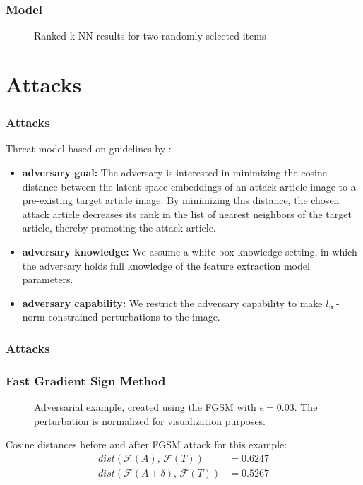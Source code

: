 \documentclass{beamer}
\begin{document}
	\begin{frame}
		\frametitle{Model}
		\begin{figure}[H]
			\centering
			\resizebox{\textwidth}{!}{}
			\caption{Ranked k-NN results for two randomly selected items}
			\label{fig:reco}
		\end{figure}
	\end{frame}
	\section{Attacks}
	\begin{frame}
		\frametitle{Attacks}
		Threat model based on guidelines by \cite{carlini2017towards}:
		\begin{itemize}
			\item \textbf{adversary goal:} The adversary is interested in minimizing the cosine distance between the latent-space embeddings of an attack article image to a pre-existing target article image. By minimizing this distance, the chosen attack article decreases its rank in the list of nearest neighbors of the target article, thereby promoting the attack article.
			\item \textbf{adversary knowledge:} We assume a white-box knowledge setting, in which the adversary holds full knowledge of the feature extraction model parameters. 
			\item \textbf{adversary capability:} We restrict the adversary capability to make $l_\infty$-norm constrained perturbations to the image.
		\end{itemize}
	\end{frame}
	\begin{frame}
		\frametitle{Attacks}
		\begin{figure}[H]
			\centering
			\resizebox{\textwidth}{!}{}
			\label{fig:attack-setup}
		\end{figure}
	\end{frame}
	
	\begin{frame}
		\frametitle{Fast Gradient Sign Method}
		\begin{figure}[H]
			\centering
			\resizebox{\textwidth}{!}{}
			\caption{Adversarial example, created using the FGSM with $\epsilon = 0.03$. The perturbation is normalized for visualization purposes.}
			\label{fig:fgsm-example}
		\end{figure}
		Cosine distances before and after FGSM attack for this example:
		\begin{align}
		dist(\mathcal{F}(A),\,\mathcal{F}(T)) &= 0.6247 \\
		dist(\mathcal{F}(A + \delta),\,\mathcal{F}(T)) &= 0.5267
		\end{align}
	\end{frame}
	
\end{document}
